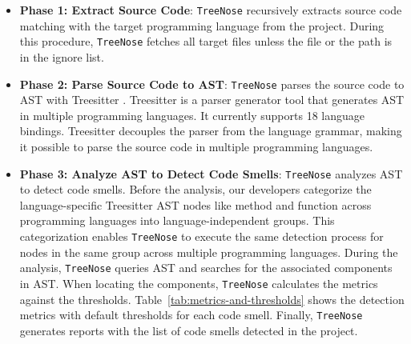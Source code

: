 \begin{itemize}[leftmargin=*]

    \item \textbf{Phase 1: Extract Source Code}: \texttt{TreeNose} recursively
        extracts source code matching with the target programming language from
        the project. During this procedure, \texttt{TreeNose} fetches all target
        files unless the file or the path is in the ignore list.
    \item \textbf{Phase 2: Parse Source Code to AST}: \texttt{TreeNose} parses
        the source code to AST with Treesitter \cite{treeSitter}. Treesitter is
        a parser generator tool that generates AST in multiple programming
        languages. It currently supports 18 language bindings. Treesitter
        decouples the parser from the language grammar, making it possible to
        parse the source code in multiple programming languages.
    \item \textbf{Phase 3: Analyze AST to Detect Code Smells}: \texttt{TreeNose}
        analyzes AST to detect code smells. Before the analysis, our developers
        categorize the language-specific Treesitter AST nodes like method and
        function across programming languages into language-independent groups.
        This categorization enables \texttt{TreeNose} to execute the same
        detection process for nodes in the same group across multiple
        programming languages. During the analysis, \texttt{TreeNose} queries
        AST and searches for the associated components in AST. When locating the
        components, \texttt{TreeNose} calculates the metrics against the
        thresholds. Table~\ref{tab:metrics-and-thresholds} shows the detection
        metrics with default thresholds for each code smell. Finally,
        \texttt{TreeNose} generates reports with the list of code smells
        detected in the project.
\end{itemize}


